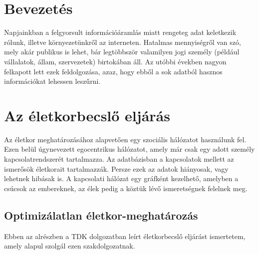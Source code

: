 \documentclass[12pt]{article}
\begin{document}
\section{Bevezetés}
Napjainkban a felgyorsult információáramlás miatt rengeteg adat keletkezik rólunk, illetve környezetünkről az interneten. %
Hatalmas mennyiségről van szó, mely akár publikus is lehet, bár legtöbbször valamilyen jogi személy (például vállalatok, állam, szervezetek) birtokában áll. Az utóbbi években nagyon felkapott lett ezek feldolgozása, azaz, hogy ebből a sok adatból hasznos információkat lehessen leszűrni.


\section{Az életkorbecslő eljárás} %
Az életkor meghatározásához alapvetően egy szociális hálózatot használunk fel. Ezen belül úgynevezett egocentrikus hálózatot, amely már csak egy adott személy kapcsolatrendszerét tartalmazza. Az adatbázisban a kapcsolatok mellett az ismerősök életkorait tartalmazzák. Persze ezek az adatok hiányosak, vagy lehetnek hibásak is. A kapcsolati hálózat egy gráfként kezelhető, amelyben a csúcsok az embereknek, az élek pedig a köztük lévő ismeretségnek felelnek meg.

\subsection{Optimizálatlan életkor-meghatározás} \label{eletkor_becsles_tamas_gabor}
Ebben az alrészben a \cite{tamas_gabor_tdk} TDK dolgozatban leírt életkorbecslő eljárást ismertetem, amely alapul szolgál ezen szakdolgozatnak.
\end{document}
